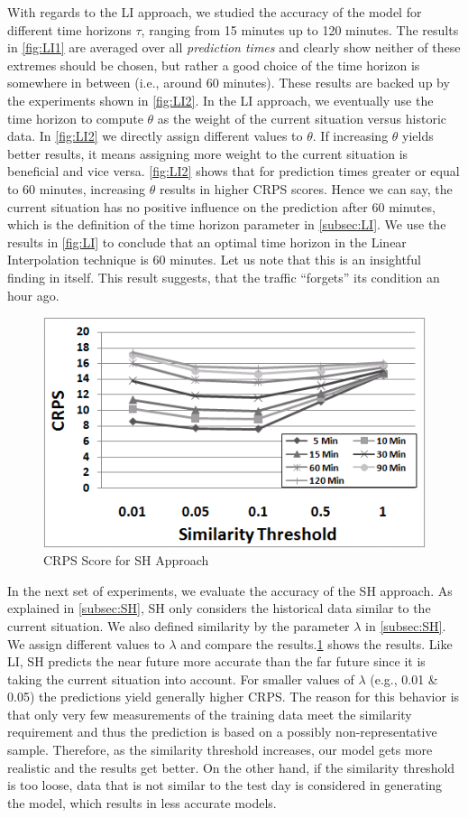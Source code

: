 With regards to the LI approach, we studied the accuracy of the model for
different time horizons $\tau$, ranging from 15 minutes up to 120 minutes. The
results in \cref{fig:LI1} are averaged over all \textit{prediction times} and
clearly show neither of these extremes should be chosen, but rather a good
choice of the time horizon is somewhere in between (i.e., around 60 minutes).
These results are backed up by the experiments shown in \cref{fig:LI2}. In the
LI approach, we eventually use the time horizon to compute $\theta$ as the
weight of the current situation versus historic data. In \cref{fig:LI2} we
directly assign different values to $\theta$. If increasing $\theta$ yields
better results, it means assigning more weight to the current situation is
beneficial and vice versa. \cref{fig:LI2} shows that for prediction times
greater or equal to 60 minutes, increasing $\theta$ results in higher CRPS
scores. Hence we can say, the current situation has no positive influence on the
prediction after 60 minutes, which is the definition of the time horizon
parameter in \cref{subsec:LI}. We use the results in \cref{fig:LI} to conclude
that an optimal time horizon in the Linear Interpolation technique is 60
minutes. Let us note that this is an insightful finding in itself. This result
suggests, that the traffic ``forgets'' its condition an hour ago.

\begin{figure}
	\centering
	\includegraphics[width = 0.6\columnwidth]{figures/Links_Filtered.png}
	\caption{CRPS Score for SH Approach}\label{fig:SH}
\end{figure}

In the next set of experiments, we evaluate the accuracy of the SH approach. As explained in \cref{subsec:SH}, SH only considers the historical data similar to the current situation. We also defined similarity by the parameter $\lambda$ in \cref{subsec:SH}. We assign different values to $\lambda$ and compare the results.\cref{fig:SH} shows the results. Like LI, SH predicts the near future more accurate than the far future since it is taking the current situation into account. For smaller values of $\lambda$ (e.g., 0.01 \& 0.05) the predictions yield generally higher CRPS. The reason for this behavior is that only very few measurements of the training data meet the similarity
requirement and thus the prediction is based on a possibly non-representative sample. Therefore, as the similarity threshold increases, our model gets more realistic and the results get better. On the other hand, if the similarity
threshold is too loose, data that is not similar to the test day is considered in generating the model, which results in less accurate models.

